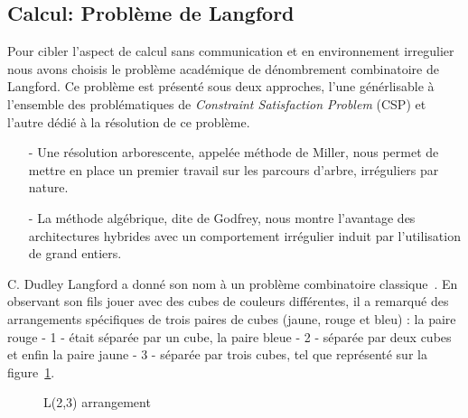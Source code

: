 \documentclass[12pt,a4paper]{report}
\newcommand{\locpath}{.}
\begin{document}
\subsection{Calcul: Problème de Langford}
Pour cibler l'aspect de calcul sans communication et en environnement irregulier nous avons choisis le problème académique de dénombrement combinatoire de Langford.
Ce problème est présenté sous deux approches, l'une générlisable à l'ensemble des problématiques de \textit{Constraint Satisfaction Problem} (CSP) et l'autre dédié à la résolution de ce problème.
\begin{itemize}[noitemsep,nolistsep]
\item[-] Une résolution arborescente, appelée méthode de Miller, nous permet de mettre en place un premier travail sur les parcours d'arbre, irréguliers par nature. 
\item[-] La méthode algébrique, dite de Godfrey, nous montre l'avantage des architectures hybrides avec un comportement irrégulier induit par l'utilisation de grand entiers.  
\end{itemize}

C. Dudley Langford a donné son nom à un problème combinatoire classique~\cite{Gard56, Simp83}.  
En observant son fils jouer avec des cubes de couleurs différentes, il a remarqué des arrangements spécifiques de trois paires de cubes (jaune, rouge et bleu) : la paire rouge - 1 - était séparée par un cube, la paire bleue - 2 - séparée par deux cubes et enfin la paire jaune - 3 - séparée par trois cubes, tel que représenté sur la figure~\ref{fig:lang}.\\

\begin{figure}   
\begin{center}    
\end{center}
\caption{L(2,3) arrangement} \label{fig:lang}  
\end{figure}
\end{document}
